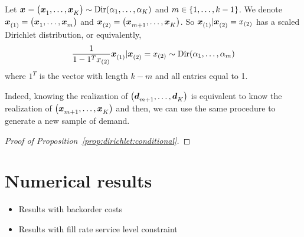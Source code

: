 \begin{prop}\label{prop:dirichlet:conditional}
  Let $\va x=\bracket{\va x_1,\ldots,\va x_K}\sim \Dir\bracket{\alpha_1,\ldots,\alpha_K}$ and $m\in\range[1]{k-1}$.
  We denote $\va x_{(1)}=\bracket{\va x_1,\ldots,\va x_m}$ and $\va x_{(2)}=\bracket{\va x_{m+1},\ldots,\va x_K}$.
  So $\va x_{(1)}|\va x_{(2)}=x_{(2)}$ has a scaled Dirichlet distribution, or equivalently,
  $$
  \frac{1}{1-1^T x_{(2)}} \va x_{(1)}|\va x_{(2)}=x_{(2)}
  \sim
  \Dir\bracket{\alpha_1,\ldots,\alpha_m}
  $$
  where $1^T$ is the vector with length $k-m$ and all entries equal to 1.
\end{prop}

Indeed, knowing the realization of $\bracket{\va\demand_{m+1},\ldots,\va\demand_K}$ is equivalent to know the realization of $\bracket{\va x_{m+1},\ldots,\va x_K}$ and then, we can use the same procedure to generate a new sample of demand.

\begin{proof}[Proof of Proposition~\ref{prop:dirichlet:conditional}]
\end{proof}


\section{Numerical results}



\begin{itemize}
  \item Results with backorder costs
  \item Results with fill rate service level constraint
\end{itemize}
